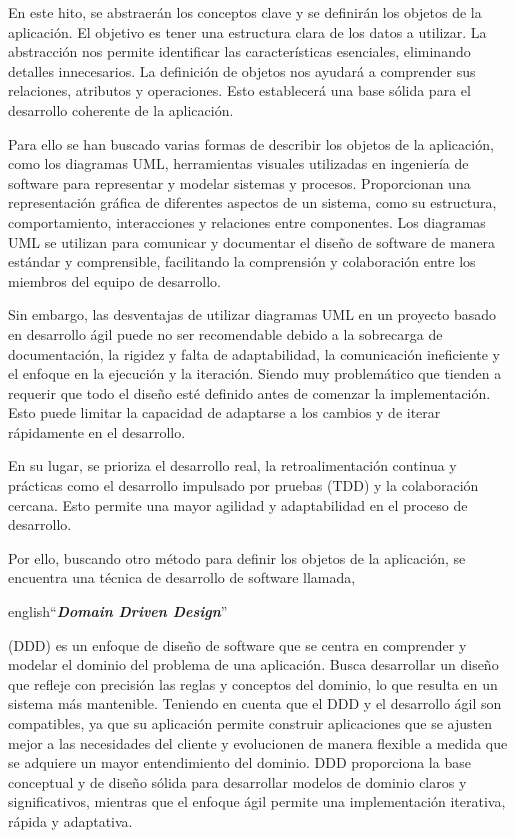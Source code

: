 En este hito, se abstraerán los conceptos clave y se definirán los objetos de la aplicación. El objetivo es tener una estructura clara de los datos a utilizar. La abstracción nos permite identificar las características esenciales, eliminando detalles innecesarios. La definición de objetos nos ayudará a comprender sus relaciones, atributos y operaciones. Esto establecerá una base sólida para el desarrollo coherente de la aplicación.

Para ello se han buscado varias formas de describir los objetos de la aplicación, como los diagramas UML, herramientas visuales utilizadas en ingeniería de software para representar y modelar sistemas y procesos. Proporcionan una representación gráfica de diferentes aspectos de un sistema, como su estructura, comportamiento, interacciones y relaciones entre componentes. Los diagramas UML se utilizan para comunicar y documentar el diseño de software de manera estándar y comprensible, facilitando la comprensión y colaboración entre los miembros del equipo de desarrollo.

Sin embargo, las desventajas de utilizar diagramas UML en un proyecto basado en desarrollo ágil puede no ser recomendable debido a la sobrecarga de documentación, la rigidez y falta de adaptabilidad, la comunicación ineficiente y el enfoque en la ejecución y la iteración. Siendo muy problemático que tienden a requerir que todo el diseño esté definido antes de comenzar la implementación. Esto puede limitar la capacidad de adaptarse a los cambios y de iterar rápidamente en el desarrollo.

En su lugar, se prioriza el desarrollo real, la retroalimentación continua y prácticas como el desarrollo impulsado por pruebas (TDD) y la colaboración cercana. Esto permite una mayor agilidad y adaptabilidad en el proceso de desarrollo.

Por ello, buscando otro método para definir los objetos de la aplicación, se encuentra una técnica de desarrollo de software llamada, \begin{otherlanguage}
{english}``\textit{\textbf{Domain Driven Design}}''\end{otherlanguage}(DDD) es un enfoque de diseño de software que se centra en comprender y modelar el dominio del problema de una aplicación. Busca desarrollar un diseño que refleje con precisión las reglas y conceptos del dominio, lo que resulta en un sistema más mantenible. Teniendo en cuenta que el DDD y el desarrollo ágil son compatibles, ya que su aplicación permite construir aplicaciones que se ajusten mejor a las necesidades del cliente y evolucionen de manera flexible a medida que se adquiere un mayor entendimiento del dominio. DDD proporciona la base conceptual y de diseño sólida para desarrollar modelos de dominio claros y significativos, mientras que el enfoque ágil permite una implementación iterativa, rápida y adaptativa.


